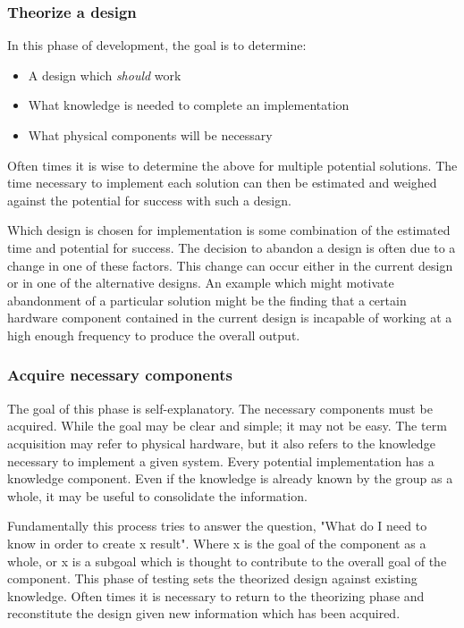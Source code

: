 \documentclass{article}	%
\begin{document}
\begin{multicols}{2}
\subsubsection{Theorize a design}
In this phase of development,
the goal is to determine:
\begin{itemize}
\item A design which \emph{should} work
\item What knowledge is needed to complete an implementation
\item What physical components will be necessary
\end{itemize}

Often times it is wise to determine the above for
multiple potential solutions.
The time necessary to implement each solution
can then be estimated and weighed against
the potential for success with such a design.

Which design is chosen for implementation is
some combination of the estimated time and
potential for success.
The decision to abandon a design is often
due to a change in one of these factors.
This change can occur either
in the current design or
in one of the alternative designs.
An example which might motivate abandonment of a 
particular solution might be
the finding that a certain hardware component
contained in the current design is incapable of 
working at a high enough frequency to
produce the overall output.


\subsubsection{Acquire necessary components}
The goal of this phase is self-explanatory.
The necessary components must be acquired.
While the goal may be clear and simple;
it may not be easy.
The term acquisition may refer to  physical hardware,
but it also refers to the knowledge necessary to implement
a given system.
Every potential implementation has a knowledge component.
Even if the knowledge is already known by the group as a whole,
it may be useful to consolidate the information.

Fundamentally this process tries to answer the question,
"What do I need to know in order to create x result".
Where x is the goal of the component as a whole, or
x is a subgoal which is thought to contribute to 
the overall goal of the component.
This phase of testing
sets the theorized design against existing knowledge.
Often times it is necessary to return to the 
theorizing phase and reconstitute the design
given new information which has been acquired.


\end{multicols}
\end{document}
